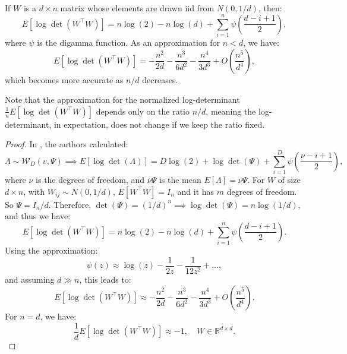 \begin{lemma}
If \( W \) is a \( d \times n \) matrix whose elements are drawn iid from \( N(0, 1/d) \), then:
\begin{equation}
E \left[\log \det(W^\top W)\right] = n \log(2) - n \log(d) + \sum_{i=1}^n \psi\left(\frac{d-i+1}{2}\right),
\end{equation}
where \( \psi \) is the digamma function. As an approximation for \( n < d \), we have:
\begin{equation}
E \left[\log \det(W^\top W)\right] = -\frac{n^2}{2d} - \frac{n^3}{6d^2} - \frac{n^4}{3 d^3} + O\left(\frac{n^5}{d^4}\right),
\end{equation}
which becomes more accurate as \( n/d \) decreases.
\end{lemma}

\begin{remark}
Note that the approximation for the normalized log-determinant \( \frac{1}{n} E \left[\log \det(W^\top W)\right] \) depends only on the ratio \( n/d \), meaning the log-determinant, in expectation, does not change if we keep the ratio fixed.
\end{remark}

\begin{proof}
In \cite{braun2010variational}, the authors calculated:
\begin{equation}
\Lambda \sim \mathcal{W}_D(v, \Psi) \implies E \left[\log \det(\Lambda)\right] = D \log(2) + \log\det(\Psi) + \sum_{i=1}^D \psi\left(\frac{\nu-i+1}{2}\right),
\end{equation}
where \( \nu \) is the degrees of freedom, and \( \nu\Psi \) is the mean \( E[\Lambda] = \nu\Psi \). For \( W \) of size \( d \times n \), with \( W_{ij} \sim N(0, 1/d) \), \( E[W^\top W] = I_n \) and it has \( m \) degrees of freedom. So \( \Psi = I_n / d \). Therefore, \( \det(\Psi) = (1/d)^n \implies \log \det(\Psi) = n \log(1/d) \), and thus we have:
\begin{equation}
E \left[\log \det(W^\top W)\right] = n \log(2) - n \log(d) + \sum_{i=1}^n \psi\left(\frac{d-i+1}{2}\right).
\end{equation}
Using the approximation:
\begin{equation}
\psi(z) \approx \log(z) - \frac{1}{2z} - \frac{1}{12 z^2} + \dots,
\end{equation}
and assuming \( d \gg n \), this leads to:
\begin{equation}
E \left[\log \det(W^\top W)\right] \approx -\frac{n^2}{2d} - \frac{n^3}{6d^2} - \frac{n^4}{3d^3} + O\left(\frac{n^5}{d^4}\right).
\end{equation}
For \( n=d \), we have:
\begin{equation}
\frac{1}{d} E \left[\log \det(W^\top W)\right] \approx -1, \quad W \in \mathbb{R}^{d \times d}.
\end{equation}
\end{proof}

